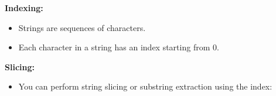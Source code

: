 
\begin{flushleft}
	\textbf{Indexing:}
	\begin{itemize}
		\item Strings are sequences of characters.
		\item Each character in a string has an index starting from 0. 
	\end{itemize}	

	\textbf{Slicing:}
	\begin{itemize}
		\item You can perform string slicing or substring extraction using the index:
		
		
	\end{itemize}

\end{flushleft}

\newpage


